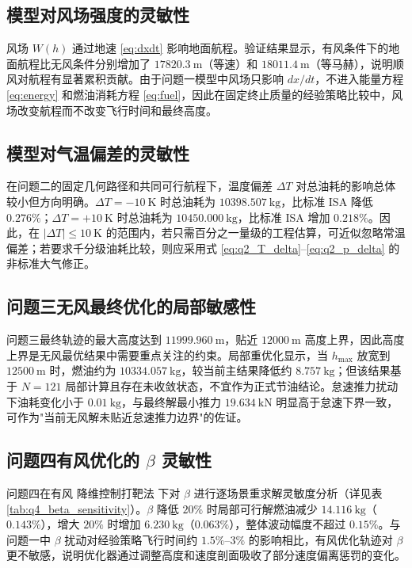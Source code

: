 \documentclass[withoutpreface,bwprint]{cumcmthesis}
\begin{document}
\subsection{模型对风场强度的灵敏性}

风场 $W(h)$ 通过地速 \eqref{eq:dxdt} 影响地面航程。验证结果显示，有风条件下的地面航程比无风条件分别增加了 $17820.3\ \mathrm{m}$（等速）和 $18011.4\ \mathrm{m}$（等马赫），说明顺风对航程有显著累积贡献。由于问题一模型中风场只影响 $dx/dt$，不进入能量方程 \eqref{eq:energy} 和燃油消耗方程 \eqref{eq:fuel}，因此在固定终止质量的经验策略比较中，风场改变航程而不改变飞行时间和最终高度。

\subsection{模型对气温偏差的灵敏性}

在问题二的固定几何路径和共同可行航程下，温度偏差 $\Delta T$ 对总油耗的影响总体较小但方向明确。$\Delta T=-10\ \mathrm{K}$ 时总油耗为 $10398.507\ \mathrm{kg}$，比标准 ISA 降低 $0.276\%$；$\Delta T=+10\ \mathrm{K}$ 时总油耗为 $10450.000\ \mathrm{kg}$，比标准 ISA 增加 $0.218\%$。因此，在 $|\Delta T|\leq10\ \mathrm{K}$ 的范围内，若只需百分之一量级的工程估算，可近似忽略常温偏差；若要求千分级油耗比较，则应采用式 \eqref{eq:q2_T_delta}--\eqref{eq:q2_p_delta} 的非标准大气修正。

\subsection{问题三无风最终优化的局部敏感性}

问题三最终轨迹的最大高度达到 $11999.960\ \mathrm{m}$，贴近 $12000\ \mathrm{m}$ 高度上界，因此高度上界是无风最优结果中需要重点关注的约束。局部重优化显示，当 $h_{\max}$ 放宽到 $12500\ \mathrm{m}$ 时，燃油约为 $10334.057\ \mathrm{kg}$，较当前主结果降低约 $8.757\ \mathrm{kg}$；但该结果基于 $N=121$ 局部计算且存在未收敛状态，不宜作为正式节油结论。怠速推力扰动下油耗变化小于 $0.01\ \mathrm{kg}$，与最终解最小推力 $19.634\ \mathrm{kN}$ 明显高于怠速下界一致，可作为"当前无风解未贴近怠速推力边界"的佐证。

\subsection{问题四有风优化的 $\beta$ 灵敏性}

问题四在有风 降维控制打靶法 下对 $\beta$ 进行逐场景重求解灵敏度分析（详见表 \ref{tab:q4_beta_sensitivity}）。$\beta$ 降低 $20\%$ 时局部可行解燃油减少 $14.116\ \mathrm{kg}$（$0.143\%$），增大 $20\%$ 时增加 $6.230\ \mathrm{kg}$（$0.063\%$），整体波动幅度不超过 $0.15\%$。与问题一中 $\beta$ 扰动对经验策略飞行时间约 $1.5\%$--$3\%$ 的影响相比，有风优化轨迹对 $\beta$ 更不敏感，说明优化器通过调整高度和速度剖面吸收了部分速度偏离惩罚的变化。
\end{document}
